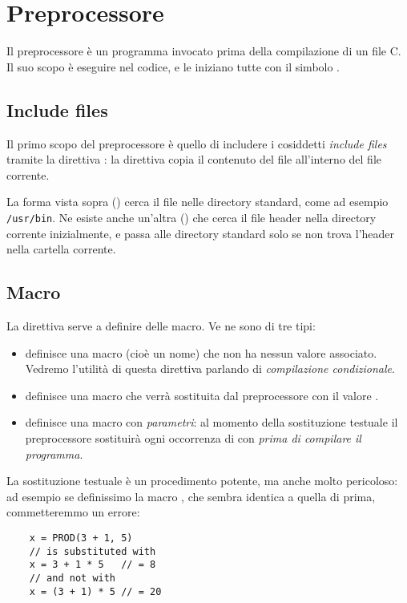\section{Preprocessore}

Il preprocessore è un programma invocato prima della compilazione di un file C. Il suo scopo è eseguire  nel codice, e le  iniziano tutte con il simbolo \inlinec{#}.

\subsection*{Include files}
Il primo scopo del preprocessore è quello di includere i cosiddetti \emph{include files} tramite la direttiva : la direttiva  copia il contenuto del file  all'interno del file corrente.

La forma vista sopra () cerca il file  nelle directory standard, come ad esempio \texttt{/usr/bin}. Ne esiste anche un'altra () che cerca il file header nella directory corrente inizialmente, e passa alle directory standard solo se non trova l'header nella cartella corrente.

\subsection*{Macro}

La direttiva  serve a definire delle macro. Ve ne sono di tre tipi: \begin{itemize}
    \item {} definisce una macro (cioè un nome) che non ha nessun valore associato. Vedremo l'utilità di questa direttiva parlando di \emph{compilazione condizionale}.
    \item {} definisce una macro  che verrà sostituita dal preprocessore con il valore .
    \item {} definisce una macro con \emph{parametri}: al momento della sostituzione testuale il preprocessore sostituirà ogni occorrenza di  con  \emph{prima di compilare il programma}.
\end{itemize}

La sostituzione testuale è un procedimento potente, ma anche molto pericoloso: ad esempio se definissimo la macro , che sembra identica a quella di prima, commetteremmo un errore:
\begin{verbatim}
    x = PROD(3 + 1, 5)
    // is substituted with
    x = 3 + 1 * 5   // = 8
    // and not with
    x = (3 + 1) * 5 // = 20
\end{verbatim}

